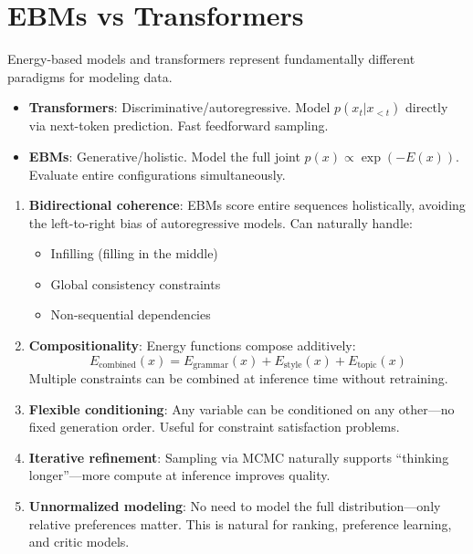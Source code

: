 \section{EBMs vs Transformers}

Energy-based models and transformers represent fundamentally different paradigms for modeling data.

\begin{remark}\leavevmode
    \begin{itemize}
        \item \textbf{Transformers}: Discriminative/autoregressive. Model $p(x_t | x_{<t})$ directly via next-token prediction. Fast feedforward sampling.
        \item \textbf{EBMs}: Generative/holistic. Model the full joint $p(x) \propto \exp(-E(x))$. Evaluate entire configurations simultaneously.
    \end{itemize}
\end{remark}

\begin{remark}\leavevmode
    \begin{enumerate}
        \item \textbf{Bidirectional coherence}: EBMs score entire sequences holistically, avoiding the left-to-right bias of autoregressive models. Can naturally handle:
        \begin{itemize}
            \item Infilling (filling in the middle)
            \item Global consistency constraints
            \item Non-sequential dependencies
        \end{itemize}

        \item \textbf{Compositionality}: Energy functions compose additively:
        \[
            E_{\text{combined}}(x) = E_{\text{grammar}}(x) + E_{\text{style}}(x) + E_{\text{topic}}(x)
        \]
        Multiple constraints can be combined at inference time without retraining.

        \item \textbf{Flexible conditioning}: Any variable can be conditioned on any other---no fixed generation order. Useful for constraint satisfaction problems.

        \item \textbf{Iterative refinement}: Sampling via MCMC naturally supports ``thinking longer''---more compute at inference improves quality.

        \item \textbf{Unnormalized modeling}: No need to model the full distribution---only relative preferences matter. This is natural for ranking, preference learning, and critic models.
    \end{enumerate}
\end{remark}

